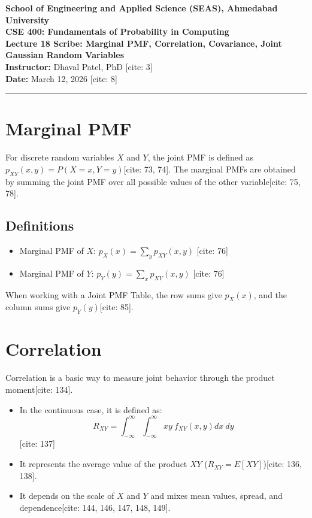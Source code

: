 \documentclass[11pt]{article}
\begin{document}
\noindent
\textbf{School of Engineering and Applied Science (SEAS), Ahmedabad University} \\
\textbf{CSE 400: Fundamentals of Probability in Computing} \\
\textbf{Lecture 18 Scribe: Marginal PMF, Correlation, Covariance, Joint Gaussian Random Variables} \\
\textbf{Instructor:} Dhaval Patel, PhD [cite: 3] \\
\textbf{Date:} March 12, 2026 [cite: 8] \\
\vspace{1em}
\hrule
\vspace{1.5em}

\section{Marginal PMF}
For discrete random variables $X$ and $Y$, the joint PMF is defined as $p_{XY}(x,y)=P(X=x,Y=y)$[cite: 73, 74]. The marginal PMFs are obtained by summing the joint PMF over all possible values of the other variable[cite: 75, 78].

\subsection{Definitions}
\begin{itemize}
    \item Marginal PMF of $X$: $p_{X}(x)=\sum_{y}p_{XY}(x,y)$ [cite: 76]
    \item Marginal PMF of $Y$: $p_{Y}(y)=\sum_{x}p_{XY}(x,y)$ [cite: 76]
\end{itemize}
When working with a Joint PMF Table, the row sums give $p_{X}(x)$, and the column sums give $p_{Y}(y)$[cite: 85]. 

\section{Correlation}
Correlation is a basic way to measure joint behavior through the product moment[cite: 134]. 
\begin{itemize}
    \item In the continuous case, it is defined as: $$R_{XY}=\int_{-\infty}^{\infty}\int_{-\infty}^{\infty}xy~f_{XY}(x,y)dx~dy$$ [cite: 137]
    \item It represents the average value of the product $XY$ ($R_{XY}=E[XY]$)[cite: 136, 138].
    \item It depends on the scale of $X$ and $Y$ and mixes mean values, spread, and dependence[cite: 144, 146, 147, 148, 149].
\end{itemize}
\end{document}
